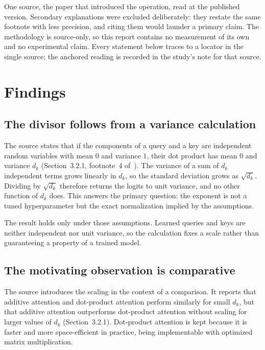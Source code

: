 \documentclass[11pt]{article}
\begin{document}
One source, the paper that introduced the operation, read at the published
version. Secondary explanations were excluded deliberately: they restate the
same footnote with less precision, and citing them would launder a primary
claim. The methodology is source-only, so this report contains no measurement
of its own and no experimental claim. Every statement below traces to a
locator in the single source; the anchored reading is recorded in the study's
note for that source.

\section{Findings}

\subsection{The divisor follows from a variance calculation}

The source states that if the components of a query and a key are independent
random variables with mean $0$ and variance $1$, their dot product has mean
$0$ and variance $d_k$ (Section~3.2.1, footnote~4
of~\citet{vaswani2017attention}). The variance of a sum of $d_k$ independent
terms grows linearly in $d_k$, so the standard deviation grows as
$\sqrt{d_k}$. Dividing by $\sqrt{d_k}$ therefore returns the logits to unit
variance, and no other function of $d_k$ does. This answers the primary
question: the exponent is not a tuned hyperparameter but the exact
normalization implied by the assumptions.

The result holds only under those assumptions. Learned queries and keys are
neither independent nor unit variance, so the calculation fixes a scale
rather than guaranteeing a property of a trained model.

\subsection{The motivating observation is comparative}

The source introduces the scaling in the context of a comparison. It reports
that additive attention and dot-product attention perform similarly for small
$d_k$, but that additive attention outperforms dot-product attention without
scaling for larger values of $d_k$ (Section~3.2.1). Dot-product attention is
kept because it is faster and more space-efficient in practice, being
implementable with optimized matrix multiplication.
\end{document}
